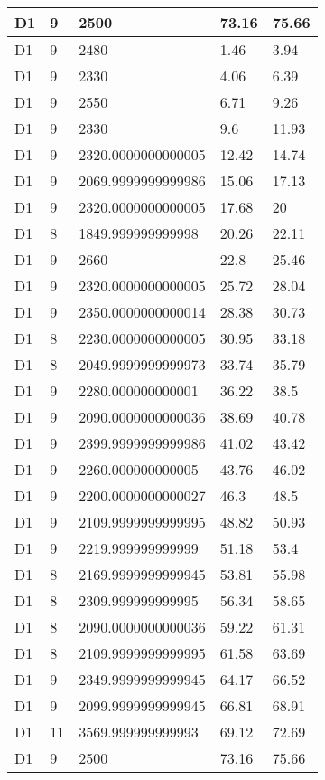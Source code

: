 \begin{longtable}{|l|l|l|l|l|}
D1 & 9 & 2500 & 73.16 & 75.66 \\ \hline
D1 & 9 & 2480 & 1.46 & 3.94 \\ \hline
D1 & 9 & 2330 & 4.06 & 6.39 \\ \hline
D1 & 9 & 2550 & 6.71 & 9.26 \\ \hline
D1 & 9 & 2330 & 9.6 & 11.93 \\ \hline
D1 & 9 & 2320.0000000000005 & 12.42 & 14.74 \\ \hline
D1 & 9 & 2069.9999999999986 & 15.06 & 17.13 \\ \hline
D1 & 9 & 2320.0000000000005 & 17.68 & 20 \\ \hline
D1 & 8 & 1849.999999999998 & 20.26 & 22.11 \\ \hline
D1 & 9 & 2660 & 22.8 & 25.46 \\ \hline
D1 & 9 & 2320.0000000000005 & 25.72 & 28.04 \\ \hline
D1 & 9 & 2350.0000000000014 & 28.38 & 30.73 \\ \hline
D1 & 8 & 2230.0000000000005 & 30.95 & 33.18 \\ \hline
D1 & 8 & 2049.9999999999973 & 33.74 & 35.79 \\ \hline
D1 & 9 & 2280.000000000001 & 36.22 & 38.5 \\ \hline
D1 & 9 & 2090.0000000000036 & 38.69 & 40.78 \\ \hline
D1 & 9 & 2399.9999999999986 & 41.02 & 43.42 \\ \hline
D1 & 9 & 2260.000000000005 & 43.76 & 46.02 \\ \hline
D1 & 9 & 2200.0000000000027 & 46.3 & 48.5 \\ \hline
D1 & 9 & 2109.9999999999995 & 48.82 & 50.93 \\ \hline
D1 & 9 & 2219.999999999999 & 51.18 & 53.4 \\ \hline
D1 & 8 & 2169.9999999999945 & 53.81 & 55.98 \\ \hline
D1 & 8 & 2309.999999999995 & 56.34 & 58.65 \\ \hline
D1 & 8 & 2090.0000000000036 & 59.22 & 61.31 \\ \hline
D1 & 8 & 2109.9999999999995 & 61.58 & 63.69 \\ \hline
D1 & 9 & 2349.9999999999945 & 64.17 & 66.52 \\ \hline
D1 & 9 & 2099.9999999999945 & 66.81 & 68.91 \\ \hline
D1 & 11 & 3569.999999999993 & 69.12 & 72.69 \\ \hline
D1 & 9 & 2500 & 73.16 & 75.66 \\ \hline

\end{longtable}
